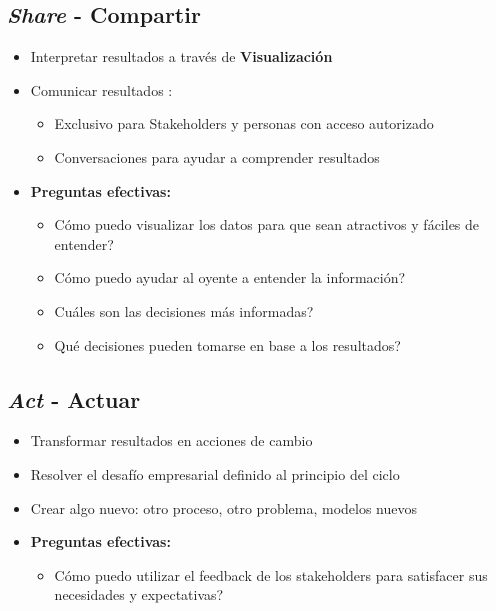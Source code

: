 \subsection{\textit{Share} - Compartir}
\begin{itemize}
    \item {Interpretar resultados a través de \textbf{Visualización}}
    \item {Comunicar resultados : 
    \begin{itemize}
        \item {Exclusivo para Stakeholders y personas con acceso autorizado}
        \item {Conversaciones para ayudar a comprender resultados}
    \end{itemize}}
    \item {\textbf{Preguntas efectivas:}
    \begin{itemize}
        \item {Cómo puedo visualizar los datos para que sean atractivos y fáciles de entender?}
        \item {Cómo puedo ayudar al oyente a entender la información?}
        \item {Cuáles son las decisiones más informadas?}
        \item {Qué decisiones pueden tomarse en base a los resultados?}
    \end{itemize}}
\end{itemize}

\subsection{\textit{Act} - Actuar}
\begin{itemize}
    \item {Transformar resultados en acciones de cambio}
    \item {Resolver el desafío empresarial definido al principio del ciclo}
    \item {Crear algo nuevo: otro proceso, otro problema, modelos nuevos}
    \item {\textbf{Preguntas efectivas: }
    \begin{itemize}
        \item {Cómo puedo utilizar el feedback de los stakeholders para satisfacer sus necesidades y expectativas?}
    \end{itemize}}
\end{itemize}

\newpage